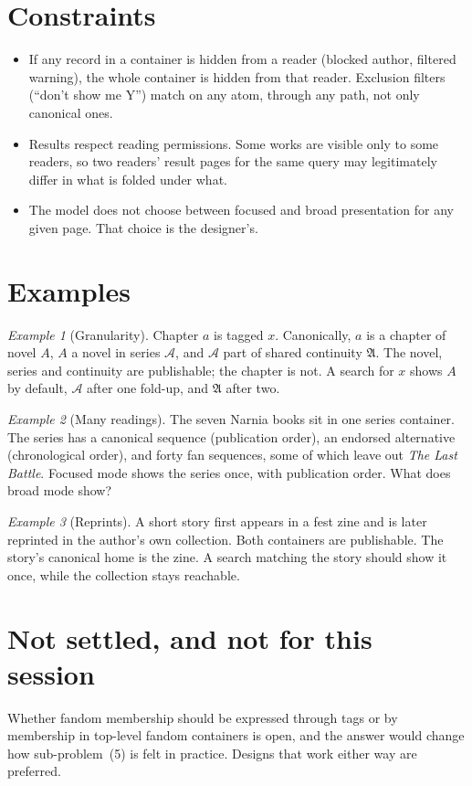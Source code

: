 \documentclass{amsart}
\theoremstyle{remark}
\newtheorem{eg}{Example}
\begin{document}
\section{Constraints}
\begin{itemize}
\item If any record in a container is hidden from a reader (blocked author, filtered warning), the whole container is hidden from that reader. Exclusion filters (``don't show me Y'') match on any atom, through any path, not only canonical ones.
\item Results respect reading permissions. Some works are visible only to some readers, so two readers' result pages for the same query may legitimately differ in what is folded under what.
\item The model does not choose between focused and broad presentation for any given page. That choice is the designer's.
\end{itemize}

\section{Examples}
\begin{eg}[Granularity]
Chapter $a$ is tagged $x$. Canonically, $a$ is a chapter of novel $A$, $A$ a novel in series $\mathcal{A}$, and $\mathcal{A}$ part of shared continuity $\mathfrak{A}$. The novel, series and continuity are publishable; the chapter is not. A search for $x$ shows $A$ by default, $\mathcal{A}$ after one fold-up, and $\mathfrak{A}$ after two.
\end{eg}
\begin{eg}[Many readings]
The seven Narnia books sit in one series container. The series has a canonical sequence (publication order), an endorsed alternative (chronological order), and forty fan sequences, some of which leave out \emph{The Last Battle}. Focused mode shows the series once, with publication order. What does broad mode show?
\end{eg}
\begin{eg}[Reprints]
A short story first appears in a fest zine and is later reprinted in the author's own collection. Both containers are publishable. The story's canonical home is the zine. A search matching the story should show it once, while the collection stays reachable.
\end{eg}

\section{Not settled, and not for this session}
Whether fandom membership should be expressed through tags or by membership in top-level fandom containers is open, and the answer would change how sub-problem~(5) is felt in practice. Designs that work either way are preferred.
\end{document}
